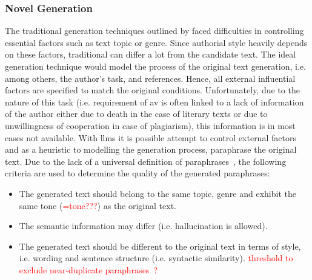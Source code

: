 \subsubsection{Novel \imp{} Generation}
\label{subsubsec:novel_impostor_generation}
The traditional generation techniques outlined by \citet{koppel_determining_2014} faced difficulties in controlling essential factors such as text topic or genre.
Since authorial style heavily depends on these factors, traditional \imps{} can differ a lot from the candidate text.
The ideal generation technique would model the process of the original text generation, 
i.e. among others, the author's task, and references.
Hence, all external influential factors are specified to match the original conditions.
Unfortunately, due to the nature of this task 
(i.e. requirement of \ac{av} is often linked to a lack of information of the author either due to death in the case of literary texts or 
due to unwillingness of cooperation in case of plagiarism), this information is in most cases not available.
With \acp{llm} it is possible attempt to control external factors and 
as a heuristic to modelling the generation process, paraphrase the original text.
Due to the lack of a universal definition of paraphrases~\citep{gohsen_task_oriented_2024}, the following criteria are used to determine the quality of the generated paraphrases:
\begin{itemize}
    \item The generated text should belong to the same topic, genre and exhibit the same tone (\textcolor{red}{=tone???}) as the original text.
    \item The semantic information may differ (i.e. hallucination is allowed).
    \item The generated text should be different to the original text in terms of style, i.e. wording and sentence structure (i.e. syntactic similarity). \textcolor{red}{threshold to exclude near-duplicate paraphrases~\citep{gohsen_captions_2023}?}
\end{itemize}



